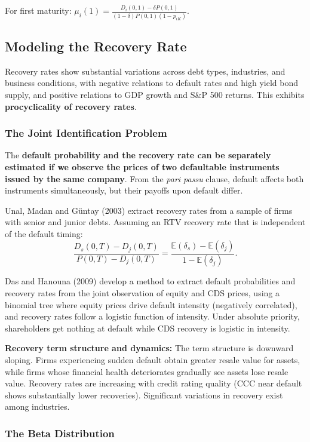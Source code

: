 \documentclass[12pt,a4paper]{article}
\begin{document}
For first maturity: $\mu_i(1) = \frac{D_i(0,1) - \delta P(0,1)}{(1-\delta)P(0,1)(1-p_{iK})}$.

\subsection{Modeling the Recovery Rate}

Recovery rates show substantial variations across debt types, industries, and business conditions, with negative relations to default rates and high yield bond supply, and positive relations to GDP growth and S\&P 500 returns. This exhibits \textbf{procyclicality of recovery rates}.

\subsubsection{The Joint Identification Problem}

The \textbf{default probability and the recovery rate can be separately estimated if we observe the prices of two defaultable instruments issued by the same company}. From the \textit{pari passu} clause, default affects both instruments simultaneously, but their payoffs upon default differ.

Unal, Madan and Güntay (2003) extract recovery rates from a sample of firms with senior and junior debts. Assuming an RTV recovery rate that is independent of the default timing:
$$\frac{D_s(0,T) - D_j(0,T)}{P(0,T) - D_j(0,T)} = \frac{\mathbb{E}(\delta_s) - \mathbb{E}(\delta_j)}{1 - \mathbb{E}(\delta_j)}.$$

Das and Hanouna (2009) develop a method to extract default probabilities and recovery rates from the joint observation of equity and CDS prices, using a binomial tree where equity prices drive default intensity (negatively correlated), and recovery rates follow a logistic function of intensity. Under absolute priority, shareholders get nothing at default while CDS recovery is logistic in intensity.

\textbf{Recovery term structure and dynamics:} The term structure is downward sloping. Firms experiencing sudden default obtain greater resale value for assets, while firms whose financial health deteriorates gradually see assets lose resale value. Recovery rates are increasing with credit rating quality (CCC near default shows substantially lower recoveries). Significant variations in recovery exist among industries.

\subsubsection{The Beta Distribution}
\end{document}
